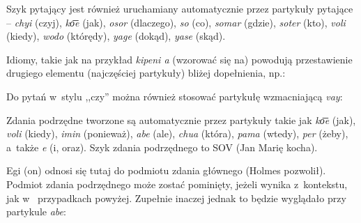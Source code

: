 \begin{spacing}{1.1}



Szyk pytający jest również uruchamiany automatycznie przez partykuły pytające -- 
\emph{chyi} (czyj), \emph{ko͞e} (jak), \emph{osor} (dlaczego), \emph{so} (co), 
\emph{somar} (gdzie), \emph{soter} (kto), \emph{voli} (kiedy), \emph{wodo} 
(którędy), \emph{yage} (dokąd), \emph{yase} (skąd).






Idiomy, takie jak na przykład \emph{kipeni a} (wzorować się na) powodują
przestawienie drugiego elementu (najczęściej partykuły) bliżej dopełnienia, np.:



Do pytań w~stylu ,,czy'' można również stosować partykułę wzmacniającą
\emph{vay}:


Zdania podrzędne tworzone są automatycznie przez partykuły takie jak \emph{ko͞e} 
(jak), \emph{voli} (kiedy), \emph{imin} (ponieważ), \emph{abe} (ale), 
\emph{chua} (która), \emph{pama} (wtedy), \emph{per} (żeby), a~także \emph{e} 
(i, oraz). Szyk zdania podrzędnego to SOV (Jan Marię kocha).



Egi (on) odnosi się tutaj do podmiotu zdania głównego (Holmes pozwolił). Podmiot
zdania podrzędnego może zostać pominięty, jeżeli wynika z~kontekstu, jak w~
przypadkach powyżej. Zupełnie inaczej jednak to będzie wyglądało przy partykule
\emph{abe}:


\end{spacing}
